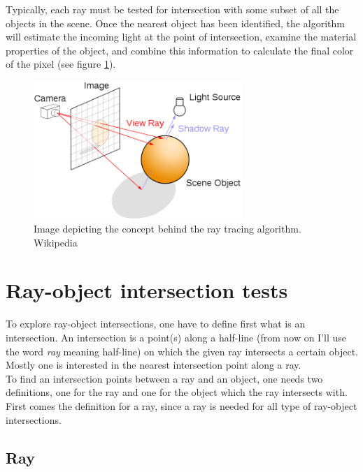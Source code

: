 \documentclass{article}
\begin{document}
Typically, each ray must be tested for intersection with some subset of all the objects in the scene. Once the nearest object has been identified, the algorithm will estimate the incoming light at the point of intersection, examine the material properties of the object, and combine this information to calculate the final color of the pixel (see figure \ref{fig:concept}). 

\begin{figure}[h]
	\centering
    \includegraphics[width=0.7\textwidth]{ray_trace_algo}
	\caption{Image depicting the concept behind the ray tracing algorithm. Wikipedia}
    \label{fig:concept}
\end{figure}


\section{Ray-object intersection tests}
\label{sec:isects}
To explore ray-object intersections, one have to define first what is an intersection. An intersection is a point(s) along a half-line (from now on I'll use the word \textit{ray} meaning half-line) on which the given ray intersects a certain object. Mostly one is interested in the nearest intersection point along a ray. \\
To find an intersection points between a ray and an object, one needs two definitions, one for the ray and one for the object which the ray intersects with. First comes the definition for a ray, since a ray is needed for all type of ray-object intersections.

\subsection{Ray}
\end{document}
